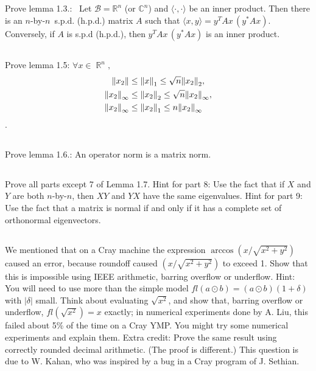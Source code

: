 \documentclass[a4paper]{ctexart}
\DeclareMathOperator{\Real}{\mathbb R}
\newcommand{\pf}{\textbf{\color{pink}{proof:}}}
\begin{document}
\pf

\subsection{}
Prove lemma 1.3.:~
Let $\mathcal{B}  = \mathbb{R}^n$ (or $\mathbb{C}^n$) and $\langle ·, ·\rangle$ be an inner product. Then there
is an $n$-by-$n$ \,s.p.d. (h.p.d.) matrix $A$ such that  $\langle x, y\rangle = y^T Ax \,(y^*Ax)$. 
Conversely, if $A$ is s.p.d (h.p.d.), then $y^TAx\,(y^*Ax)$ is an inner product.

\pf

\subsection{}
Prove lemma 1.5: $\forall x \in \Real^n,$\\ 
\begin{eqnarray*}
    \norm{x_2}& \leq\norm{x}_1\leq \sqrt{n}\norm{x_2}_2,\\ 
    \norm{x_2}_{\infty} & \leq\norm{x_2}_2\leq \sqrt{n}\norm{x_2}_{\infty},\\ 
    \norm{x_2}_{\infty} & \leq\norm{x_2}_1\leq n\norm{x_2}_{\infty}
\end{eqnarray*}.

\pf

\subsection{}
Prove lemma 1.6.: An operator norm is a matrix norm.

\pf

\subsection{}
Prove all parts except 7 of Lemma 1.7. Hint for
part 8: Use the fact that if $X$ and $Y$ are both $n$-by-$n$, then $XY$ and $YX$ have
the same eigenvalues. Hint for part 9: Use the fact that a matrix is normal if
and only if it has a complete set of orthonormal eigenvectors.

\pf

\subsection{}
We mentioned that on a Cray machine
the expression $\arccos(x/\sqrt{x^2 + y^2})$ caused an error, because roundoff caused
$(x/\sqrt{x^2 + y^2})$ to exceed 1. Show that this is impossible using IEEE arithmetic,
barring overflow or underflow. Hint: You will need to use more than the simple
model $fl(a \odot b)=(a \odot b)(1 + \delta)$ with $|\delta|$ small. Think about evaluating $\sqrt{x^2}$,
and show that, barring overflow or underflow, $fl(\sqrt{x^2}) = x$ exactly; in numerical
experiments done by A. Liu, this failed about 5\% of the time on a Cray YMP.
You might try some numerical experiments and explain them. Extra credit:
Prove the same result using correctly rounded decimal arithmetic. (The proof
is different.) This question is due to W. Kahan, who was inspired by a bug in
a Cray program of J. Sethian.
\end{document}
